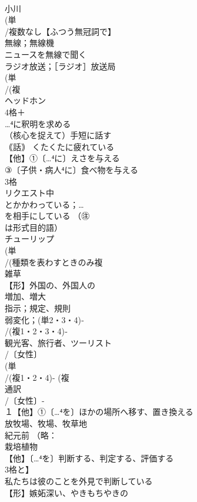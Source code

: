 \documentclass[8pt]{extreport}
\begin{document}
\begin{CJK}{UTF8}{min}
\\	小川 
\\	(単
\\	/複数なし【ふつう無冠詞で】 
\\	無線；無線機　
\\	ニュースを無線で聞く　
\\	ラジオ放送；［ラジオ］放送局 
\\	(単
\\	/(複
\\	ヘッドホン
\\	4格＋
\\	…⁴に釈明を求める
\\	（核心を捉えて）手短に話す
\\	｟話｠ くたくたに疲れている
\\	【他】①〔…⁴に〕えさを与える 
\\	③〔子供・病人⁴に〕食べ物を与える
\\	3格 
\\	リクエスト中	
\\	とかかわっている；…
\\	を相手にしている （㊟
\\	は形式目的語）
\\	チューリップ 
\\	(単
\\	/(種類を表わすときのみ複
\\	雑草 
\\	【形】外国の、外国人の 
\\	増加、増大 
\\	指示；規定、規則
\\	弱変化；(単2・3・4)‐
\\	/(複1・2・3・4)‐
\\	観光客、旅行者、ツーリスト 
\\	/〔女性〕
\\	(単
\\	/(複1・2・4)- (複
\\	通訳 
\\	/〔女性〕-
\\	１【他】①〔…⁴を〕ほかの場所へ移す、置き換える
\\	放牧場、牧場、牧草地 
\\	紀元前 （略：
\\	栽培植物 
\\	【他】〔…⁴を〕判断する、判定する、評価する 
\\	3格と】
\\	私たちは彼のことを外見で判断している
\\	【形】嫉妬深い、やきもちやきの 

\end{CJK}
\end{document}
